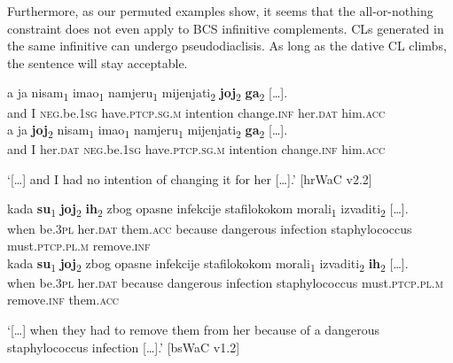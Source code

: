 Furthermore, as our permuted examples show, it seems that the all-or-nothing constraint does not even apply to BCS infinitive complements. CLs generated in the same infinitive can undergo pseudodiaclisis. As long as the dative CL climbs, the sentence will stay acceptable. 

\begin{exe}\ex
\begin{xlist}
\ex\label{(11.102)}
\gll [\dots] a ja nisam\textsubscript{1} imao\textsubscript{1} namjeru\textsubscript{1} mijenjati\textsubscript{2} \textbf{joj}\textsubscript{2} {\textbf{ga}\textsubscript{2} [\dots].} \\
{} and I \textsc{neg}.be.1\textsc{sg} have.\textsc{ptcp}.\textsc{sg}.\textsc{m} intention change.\textsc{inf} her.\textsc{dat} him.\textsc{acc}\\
\ex\label{(11.102b)}
\gll [\dots] a ja \textbf{joj}\textsubscript{2} nisam\textsubscript{1} imao\textsubscript{1} namjeru\textsubscript{1} mijenjati\textsubscript{2} {\textbf{ga}\textsubscript{2} [\dots].} \\
 {} and I her.\textsc{dat} \textsc{neg}.be.1\textsc{sg} have.\textsc{ptcp}.\textsc{sg}.\textsc{m} intention change.\textsc{inf}  him.\textsc{acc}\\
\end{xlist}
\glt ‘[\dots] and I had no intention of changing it for her [\dots].’ 
\hfill [hrWaC v2.2]

\ex
\begin{xlist}
\ex\label{(11.103)}
\gll [\dots] kada \textbf{su}\textsubscript{1} \textbf{joj}\textsubscript{2} \textbf{ih}\textsubscript{2} zbog opasne infekcije stafilokokom morali\textsubscript{1} {izvaditi\textsubscript{2} [\dots].}\\
 {} when be.3\textsc{pl} her.\textsc{dat} them.\textsc{acc} because dangerous infection staphylococcus must.\textsc{ptcp}.\textsc{pl}.\textsc{m} remove.\textsc{inf} \\
\ex\label{(11.103b)}
\gll [\dots] kada \textbf{su}\textsubscript{1} \textbf{joj}\textsubscript{2} zbog opasne infekcije stafilokokom morali\textsubscript{1} izvaditi\textsubscript{2} {\textbf{ih}\textsubscript{2} [\dots].}\\
 {} when be.3\textsc{pl} her.\textsc{dat} because dangerous infection staphylococcus must.\textsc{ptcp}.\textsc{pl}.\textsc{m} remove.\textsc{inf} them.\textsc{acc} \\
\end{xlist}
\glt ‘[\dots] when they had to remove them from her because of a dangerous staphylococcus infection [\dots].’
\hfill [bsWaC v1.2]
\end{exe}


